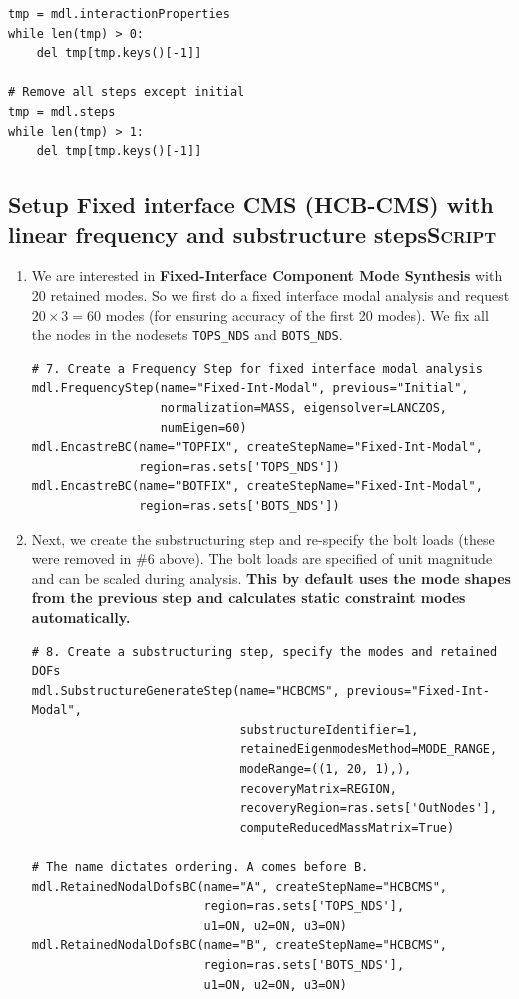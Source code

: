 \documentclass[11pt]{article}
\begin{document}
\begin{enumerate}
\begin{verbatim}
tmp = mdl.interactionProperties
while len(tmp) > 0:
    del tmp[tmp.keys()[-1]]

# Remove all steps except initial
tmp = mdl.steps
while len(tmp) > 1:
    del tmp[tmp.keys()[-1]]
\end{verbatim}
\end{enumerate}
\subsection{Setup Fixed interface CMS (HCB-CMS) with linear frequency and substructure steps\hfill{}\textsc{Script}}
\label{sec:org23f3eab}
\begin{enumerate}
\item We are interested in \textbf{Fixed-Interface Component Mode Synthesis} with 20 retained modes.
So we first do a fixed interface modal analysis and request \(20\times3 = 60\) modes (for ensuring accuracy of the first 20 modes).
We fix all the nodes in the nodesets \texttt{TOPS\_NDS} and \texttt{BOTS\_NDS}.
\begin{verbatim}
# 7. Create a Frequency Step for fixed interface modal analysis
mdl.FrequencyStep(name="Fixed-Int-Modal", previous="Initial",
                  normalization=MASS, eigensolver=LANCZOS,
                  numEigen=60)
mdl.EncastreBC(name="TOPFIX", createStepName="Fixed-Int-Modal",
               region=ras.sets['TOPS_NDS'])
mdl.EncastreBC(name="BOTFIX", createStepName="Fixed-Int-Modal",
               region=ras.sets['BOTS_NDS'])
\end{verbatim}
\item Next, we create the substructuring step and re-specify the bolt loads (these were removed in \#6 above).
The bolt loads are specified of unit magnitude and can be scaled during analysis.
\textbf{This by default uses the mode shapes from the previous step and calculates static constraint modes automatically.}
\begin{verbatim}
# 8. Create a substructuring step, specify the modes and retained DOFs
mdl.SubstructureGenerateStep(name="HCBCMS", previous="Fixed-Int-Modal",
                             substructureIdentifier=1, 
                             retainedEigenmodesMethod=MODE_RANGE,
                             modeRange=((1, 20, 1),),
                             recoveryMatrix=REGION,
                             recoveryRegion=ras.sets['OutNodes'],
                             computeReducedMassMatrix=True)

# The name dictates ordering. A comes before B.
mdl.RetainedNodalDofsBC(name="A", createStepName="HCBCMS", 
                        region=ras.sets['TOPS_NDS'], 
                        u1=ON, u2=ON, u3=ON)
mdl.RetainedNodalDofsBC(name="B", createStepName="HCBCMS", 
                        region=ras.sets['BOTS_NDS'], 
                        u1=ON, u2=ON, u3=ON)


\end{verbatim}
\end{enumerate}
\end{document}
